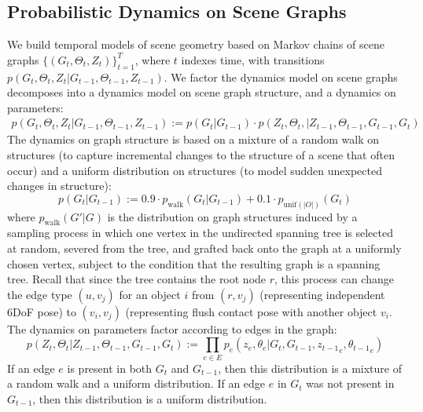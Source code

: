 \subsection{Probabilistic Dynamics on Scene Graphs}
We build temporal models of scene geometry based on Markov chains of scene graphs $\{(G_t, \Theta_t, Z_t)\}_{t=1}^T$, where $t$ indexes time, with transitions $p(G_t, \Theta_t, Z_t | G_{t-1}, \Theta_{t-1}, Z_{t-1})$.
We factor the dynamics model on scene graphs decomposes into a dynamics model on scene graph structure, and a dynamics on parameters:
\begin{align}
    p(G_t, \Theta_t, Z_t | G_{t-1}, \Theta_{t-1}, Z_{t-1}) :=
        p(G_t | G_{t-1})
        \cdot p(Z_t, \Theta_t, | Z_{t-1}, \Theta_{t-1}, G_{t-1}, G_t)
\end{align}
The dynamics on graph structure is based on a mixture of a random walk on structures (to capture incremental changes to the structure of a scene that often occur) and a uniform distribution on structures (to model sudden unexpected changes in structure):
\begin{equation}
    p(G_t | G_{t-1}) :=  0.9 \cdot p_{\mathrm{walk}}(G_t | G_{t-1}) + 0.1 \cdot p_{\mathrm{unif}(|O|)}(G_t)
\end{equation}
where $p_{\mathrm{walk}}(G' | G)$ is the distribution on graph structures induced by a sampling process in which one vertex in the undirected spanning tree is selected at random, severed from the tree, and grafted back onto the graph at a uniformly chosen vertex, subject to the condition that the resulting graph is a spanning tree.
Recall that since the tree contains the root node $r$, this process can change the edge type $(u, v_j)$ for an object $i$ from $(r, v_j)$ (representing independent 6DoF pose) to $(v_i, v_j)$ (representing flush contact pose with another object $v_i$.
The dynamics on parameters factor according to edges in the graph:
\begin{equation}
    p(Z_t, \Theta_t | Z_{t-1}, \Theta_{t-1}, G_{t-1}, G_t) := \prod_{e \in E} p_e(z_e, \theta_e | G_t, G_{t-1}, {z_{t-1}}_e, {\theta_{t-1}}_e)
\end{equation}
If an edge $e$ is present in both $G_t$ and $G_{t-1}$, then this distribution is a mixture of a random walk and a uniform distribution.
If an edge $e$ in $G_t$ was not present in $G_{t-1}$, then this distribution is a uniform distribution.

